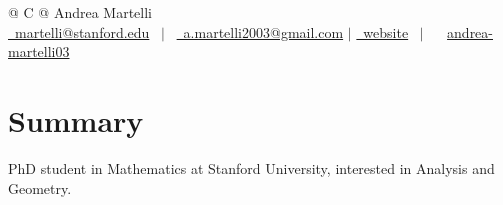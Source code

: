 \documentclass[a4paper,12pt]{article}
\begin{document}
\pagestyle{empty} 



\begin{tabularx}{\linewidth}{@{} C @{}}
\Huge{Andrea Martelli} \\[7.5pt] 
\href{mailto:martelli@stanford.edu}{\raisebox{-0.05\height}\faEnvelope \ martelli@stanford.edu} \ $|$ \ \href{mailto:a.martelli2003@gmail.com} {\raisebox{-0.05\height}\faEnvelope \ a.martelli2003@gmail.com}
$|$ \href{https://sites.google.com/view/andrea-martelli}{\raisebox{-0.05\height}\faGlobe\ website} \ $|$ \ 
\faLinkedin \ \href{https://www.linkedin.com/in/andrea-martelli03/}{andrea-martelli03} 
\end{tabularx}


\section{Summary}
PhD student in Mathematics at Stanford University, interested in Analysis and Geometry.




\end{document}
